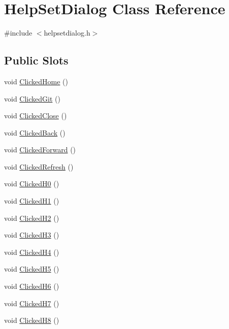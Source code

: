 \hypertarget{classHelpSetDialog}{\section{\-Help\-Set\-Dialog \-Class \-Reference}
\label{classHelpSetDialog}
}


{\ttfamily \#include $<$helpsetdialog.\-h$>$}

\subsection*{\-Public \-Slots}
\begin{DoxyCompactItemize}
\item 
void \hyperlink{classHelpSetDialog_a392d911572314f20320bf43e1c97dacd}{\-Clicked\-Home} ()
\item 
void \hyperlink{classHelpSetDialog_a9837a1246bd3dfdc6e1adee2a49f2157}{\-Clicked\-Git} ()
\item 
void \hyperlink{classHelpSetDialog_aa3c79e2757893a38dd2e53271376ddb3}{\-Clicked\-Close} ()
\item 
void \hyperlink{classHelpSetDialog_a7183c0405fa07f127a0a9abc6929a8c7}{\-Clicked\-Back} ()
\item 
void \hyperlink{classHelpSetDialog_a2c435b9d4baaaf700d68e2f3433be28d}{\-Clicked\-Forward} ()
\item 
void \hyperlink{classHelpSetDialog_a9c38de387e813f10d1783e9327fe4c5a}{\-Clicked\-Refresh} ()
\item 
void \hyperlink{classHelpSetDialog_ae381f3412a99fec40b901265d0b393c5}{\-Clicked\-H0} ()
\item 
void \hyperlink{classHelpSetDialog_a6c83306c35879d7d46af2b0e1818b0c1}{\-Clicked\-H1} ()
\item 
void \hyperlink{classHelpSetDialog_a21e7bb69468d2d75db0f7c106bdd66fa}{\-Clicked\-H2} ()
\item 
void \hyperlink{classHelpSetDialog_a67325da32306a5330c51639cbb793311}{\-Clicked\-H3} ()
\item 
void \hyperlink{classHelpSetDialog_af2e0e69fc351dce5a0982a1fca5730cf}{\-Clicked\-H4} ()
\item 
void \hyperlink{classHelpSetDialog_a0ef6a793476a27e4a452985d3264bf69}{\-Clicked\-H5} ()
\item 
void \hyperlink{classHelpSetDialog_adadd548eb11c585c0daf8df7d00e09c1}{\-Clicked\-H6} ()
\item 
void \hyperlink{classHelpSetDialog_ab672ac4bea4fd9d86e47dfe4c0359cc8}{\-Clicked\-H7} ()
\item 
void \hyperlink{classHelpSetDialog_aeb83aba8c60d5b6793f2c4f607be1323}{\-Clicked\-H8} ()
\end{DoxyCompactItemize}
